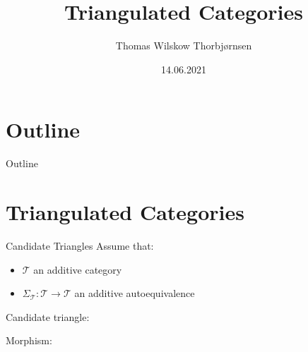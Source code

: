 \documentclass{beamer}
\title{Triangulated Categories}
\author{Thomas Wilskow Thorbjørnsen}
\date{14.06.2021}
\begin{document}
    
    \begin{frame}
        \titlepage
    \end{frame}

    \section*{Outline}
    \begin{frame}{Outline}
        \tableofcontents
    \end{frame}

    \section{Triangulated Categories}
        \begin{frame}{Candidate Triangles}
            Assume that:
            \begin{itemize}
                \item $\mathcal{T}$ an additive category
                \item $\Sigma_{\mathcal{T}}:\mathcal{T}\rightarrow \mathcal{T}$ an additive autoequivalence
            \end{itemize}
            
            \begin{definition}
                \begin{flushleft}
                    Candidate triangle:
                \end{flushleft}

                \begin{flushleft}
                    Morphism:
                \end{flushleft}
            \end{definition}
        \end{frame}
\end{document}
